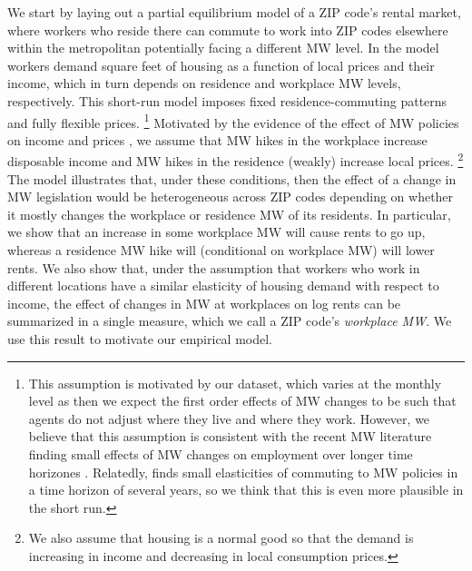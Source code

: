 We start by laying out a partial equilibrium model of a ZIP code's rental market, 
where workers who reside there can commute to work into ZIP codes elsewhere
within the metropolitan potentially facing a different MW level.
In the model workers demand square feet of housing as a function
of local prices and their income, which in turn depends on residence and workplace MW 
levels, respectively.
This short-run model imposes fixed residence-commuting patterns and fully flexible 
prices.%
\footnote{This assumption is motivated by our dataset, which varies at the monthly
level as then we expect the first order effects of MW changes to be such that 
agents do not adjust where they live and where they work.
However, we believe that this assumption is consistent with the recent MW literature
finding small effects of MW changes on employment over longer time horizones
\parencite[see][for a review]{Dube2019}.
Relatedly, \textcite{PerezPerez2021} finds small elasticities of commuting to MW 
policies in a time horizon of several years, so we think that this is even more 
plausible in the short run.}
Motivated by the evidence of the effect of MW policies on income and prices 
\parencite{AllegrettoReich2018,Leung2021}, we assume that MW hikes in the workplace 
increase disposable income and MW hikes in the residence (weakly) increase local 
prices.%
\footnote{We also assume that housing is a normal good so that the demand is 
increasing in income and decreasing in local consumption prices.}
The model illustrates that, under these conditions, then the effect of a change 
in MW legislation would be heterogeneous across ZIP codes depending on whether it 
mostly changes the workplace or residence MW of its residents.
In particular, we show that an increase in some workplace MW will cause rents to 
go up, whereas a residence MW hike will (conditional on workplace MW) will lower 
rents.
We also show that, under the assumption that workers who work in different 
locations have a similar elasticity of housing demand with respect to income, the 
effect of changes in MW at workplaces on log rents can be summarized in a single 
measure, which we call a ZIP code's \textit{workplace MW}.
We use this result to motivate our empirical model.


